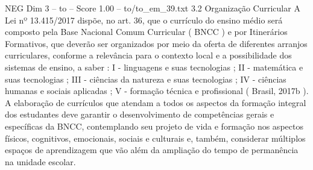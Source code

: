 \begin{textsample}{NEG Dim 3 – to – Score 1.00 – to/to\_em\_39.txt}  \label{ex:f3_neg_184}
3.2 Organização Curricular A Lei nº 13.415/2017 dispõe, no art. 36, que o currículo do ensino médio será composto pela Base Nacional Comum Curricular ( BNCC ) e por Itinerários Formativos, que deverão ser organizados por meio da oferta de diferentes arranjos curriculares, conforme a relevância para o contexto local e a possibilidade dos sistemas de ensino, a saber : I - linguagens e suas tecnologias ; II - matemática e suas tecnologias ; III - ciências da natureza e suas tecnologias ; IV - ciências humanas e sociais aplicadas ; V - formação técnica e profissional ( Brasil, 2017b ).
A elaboração de currículos que atendam a todos os aspectos da formação integral dos estudantes deve garantir o desenvolvimento de competências gerais e específicas da BNCC, contemplando seu projeto de vida e formação nos aspectos físicos, cognitivos, emocionais, sociais e culturais e, também, considerar múltiplos espaços de aprendizagem que vão além da ampliação do tempo de permanência na unidade escolar.

\end{textsample}
